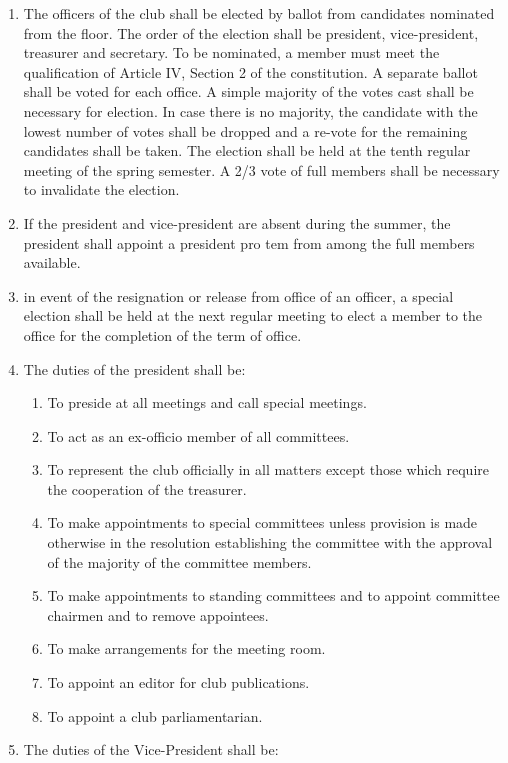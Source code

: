 \documentclass[
]{article}
\providecommand{\tightlist}{%
  \setlength{\itemsep}{0pt}\setlength{\parskip}{0pt}}
\begin{document}
\begin{enumerate}
\def\labelenumi{\arabic{enumi}.}
\tightlist
\item
  The officers of the club shall be elected by ballot from candidates
  nominated from the floor. The order of the election shall be
  president, vice-president, treasurer and secretary. To be nominated, a
  member must meet the qualification of Article IV, Section 2 of the
  constitution. A separate ballot shall be voted for each office. A
  simple majority of the votes cast shall be necessary for election. In
  case there is no majority, the candidate with the lowest number of
  votes shall be dropped and a re-vote for the remaining candidates
  shall be taken. The election shall be held at the tenth regular
  meeting of the spring semester. A 2/3 vote of full members shall be
  necessary to invalidate the election.
\item
  If the president and vice-president are absent during the summer, the
  president shall appoint a president pro tem from among the full
  members available.
\item
  in event of the resignation or release from office of an officer, a
  special election shall be held at the next regular meeting to elect a
  member to the office for the completion of the term of office.
\item
  The duties of the president shall be:

  \begin{enumerate}
  \def\labelenumii{\Alph{enumii}.}
  \tightlist
  \item
    To preside at all meetings and call special meetings.
  \item
    To act as an ex-officio member of all committees.
  \item
    To represent the club officially in all matters except those which
    require the cooperation of the treasurer.
  \item
    To make appointments to special committees unless provision is made
    otherwise in the resolution establishing the committee with the
    approval of the majority of the committee members.
  \item
    To make appointments to standing committees and to appoint committee
    chairmen and to remove appointees.
  \item
    To make arrangements for the meeting room.
  \item
    To appoint an editor for club publications.
  \item
    To appoint a club parliamentarian.
  \end{enumerate}
\item
  The duties of the Vice-President shall be:


\end{enumerate}
\end{document}
